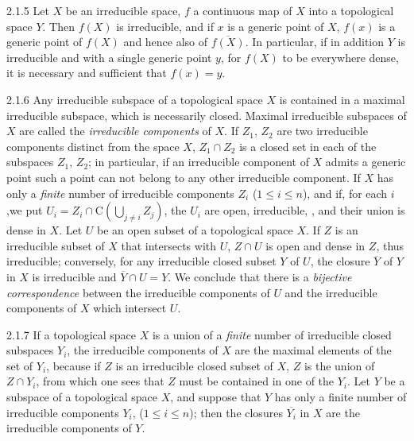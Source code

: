 \documentclass{book}
\begin{document}
\begin{env}{2.1.5}
\label{env-0.2.1.5}
Let $X$ be an irreducible space, $f$ a continuous map of $X$ into a topological space $Y$.
Then $f(X)$ is irreducible, and if $x$ is a generic point of $X$, $f(x)$ is a generic point of
$f(X)$ and hence also of $\overline{f(X)}$. In particular, if in addition $Y$ is irreducible and
with a single generic point $y$, for $f(X)$ to be everywhere dense, it is necessary and sufficient
that $f(x)=y$.
\end{env}

\begin{env}{2.1.6}
\label{env-0.2.1.6}
Any irreducible subspace of a topological space $X$ is contained
in a maximal irreducible subspace, which is necessarily closed.
Maximal irreducible subspaces of $X$ are called the \emph{irreducible components} of $X$.
If $Z_1$, $Z_2$ are two irreducible components distinct from the space $X$, $Z_1\cap Z_2$ is a closed
 set in each of the subspaces $Z_1$, $Z_2$; in particular, if an irreducible component
of $X$ admits a generic point  such a point can not belong to any other
irreducible component. If $X$ has only a \emph{finite} number of irreducible 
components $Z_i$ ($1\leq i\leq n$), and if, for each $i$,we put $U_i=Z_i\cap\mathrm{C}(\bigcup_{j\neq i}Z_j)$,
the $U_i$ are open, irreducible, , and their union is dense in $X$.
Let $U$ be an open subset of a topological space $X$. If $Z$ is an irreducible subset of $X$
that intersects with $U$, $Z\cap U$ is open and dense in $Z$, thus irreducible; conversely, for any irreducible
closed subset $Y$ of $U$, the closure $\overline{Y}$ of $Y$ in $X$ is irreducible and $\overline{Y}\cap U=Y$.
We conclude that there is a \emph{bijective correspondence} between the irreducible components of $U$ and the
irreducible components of $X$ which intersect $U$.
\end{env}

\begin{env}{2.1.7}
\label{env-0.2.1.7}
If a topological space $X$ is a union of a \emph{finite} number of irreducible closed subspaces $Y_i$, the
irreducible components of $X$ are the maximal elements of the set of $Y_i$, because if $Z$ is an irreducible
closed subset of $X$, $Z$ is the union of $Z\cap Y_i$, from which one sees that $Z$ must be contained in one
of the $Y_i$. Let $Y$ be a subspace of a topological space $X$, and suppose that $Y$ has only a finite number
of irreducible components $Y_i$, ($1\leq i\leq n$); then the closures $\overline{Y_i}$ in $X$ are the
irreducible components of $Y$.
\end{env}
\end{document}
